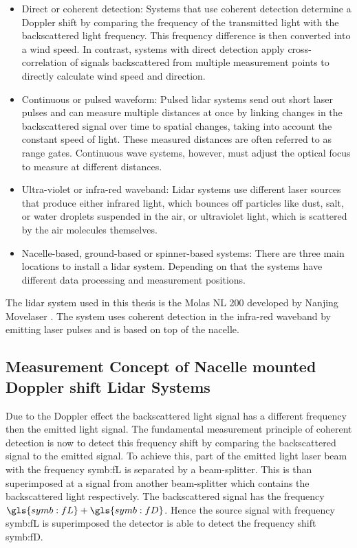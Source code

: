 \begin{itemize}
	\item Direct or coherent detection: Systems that use coherent detection determine a Doppler shift by comparing the frequency of the transmitted light with the backscattered light frequency. This frequency difference is then converted into a wind speed. In contrast, systems with direct detection apply cross-correlation of signals backscattered from multiple measurement points to directly calculate wind speed and direction.
	
	\item Continuous or pulsed waveform: Pulsed lidar systems send out short laser pulses and can measure multiple distances at once by linking changes in the backscattered signal over time to spatial changes, taking into account the constant speed of light. These measured distances are often referred to as range gates. Continuous wave systems, however, must adjust the optical focus to measure at different distances.
	
	\item Ultra-violet or infra-red waveband: Lidar systems use different laser sources that produce either infrared light, which bounces off particles like dust, salt, or water droplets suspended in the air, or ultraviolet light, which is scattered by the air molecules themselves.
	
	\item Nacelle-based, ground-based or spinner-based systems: There are three main locations to install a \gls{lidar} system. Depending on that the systems have different data processing and measurement positions.
\end{itemize}
%
The \gls{lidar} system used in this thesis is the Molas NL 200 developed by Nanjing Movelaser \cite{MolasNL200}. The system uses coherent detection in the infra-red waveband by emitting laser pulses and is based on top of the nacelle.

\subsection{Measurement Concept of Nacelle mounted Doppler shift Lidar Systems}\label{subsec:LidarInWindConcept}
Due to the Doppler effect the backscattered light signal has a different frequency then the emitted light signal. The fundamental measurement principle of coherent detection is now to detect this frequency shift by comparing the backscattered signal to the emitted signal. To achieve this, part of the emitted light laser beam with the frequency \gls{symb:fL} is separated by a beam-splitter. This is than superimposed at a signal from another beam-splitter which contains the backscattered light respectively. The backscattered signal has the frequency $\gls{symb:fL} + \gls{symb:fD}$. Hence the source signal with frequency \gls{symb:fL} is superimposed the detector is able to detect the frequency shift \gls{symb:fD}.     

